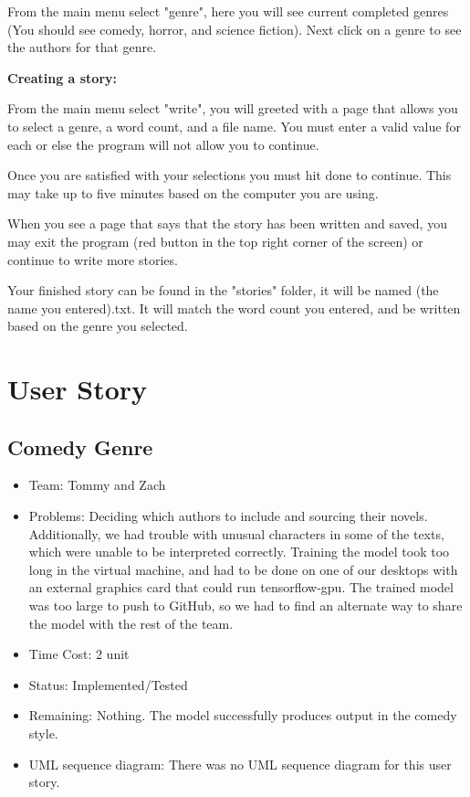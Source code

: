 \documentclass[12pt]{article}
\begin{document}
From the main menu select "genre", here you will see current completed genres (You should see comedy, horror, and science fiction).
Next click on a genre to see the authors for that genre. 

\textbf{Creating a story:}

From the main menu select "write", you will greeted with a page that allows you to select a genre, a word count, and a file name. You must enter a valid value for each or else the program will not allow you to continue. 

Once you are satisfied with your selections you must hit done to continue. This may take up to five minutes based on the computer you are using.

When you see a page that says that the story has been written and saved, you may exit the program (red button in the top right corner of the screen) or continue to write more stories. 

Your finished story can be found in the "stories" folder, it will be named (the name you entered).txt. It will match the word count you entered, and be written based on the genre you selected. 

\section{User Story}

\subsection{Comedy Genre}
\begin{itemize}
\item Team: Tommy and Zach
\item Problems: Deciding which authors to include and sourcing their novels. Additionally, we had trouble with unusual characters in some of the texts, which were unable to be interpreted correctly. Training the model took too long in the virtual machine, and had to be done on one of our desktops with an external graphics card that could run tensorflow-gpu. The trained model was too large to push to GitHub, so we had to find an alternate way to share the model with the rest of the team.
\item Time Cost: 2 unit 
\item Status: Implemented/Tested
\item Remaining: Nothing. The model successfully produces output in the comedy style.
\item UML sequence diagram: There was no UML sequence diagram for this user story.
\end{itemize}
\end{document}
